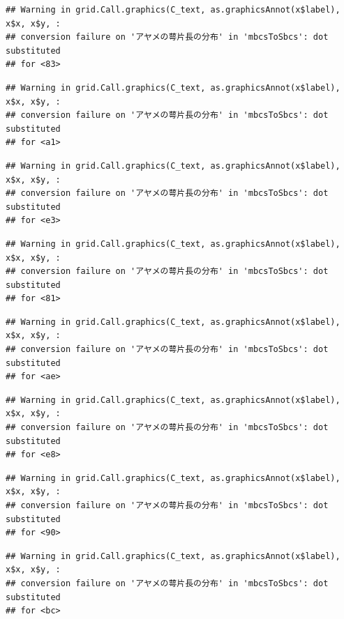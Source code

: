 \documentclass[
]{book}
\begin{document}
\begin{verbatim}
## Warning in grid.Call.graphics(C_text, as.graphicsAnnot(x$label), x$x, x$y, :
## conversion failure on 'アヤメの萼片長の分布' in 'mbcsToSbcs': dot substituted
## for <83>
\end{verbatim}

\begin{verbatim}
## Warning in grid.Call.graphics(C_text, as.graphicsAnnot(x$label), x$x, x$y, :
## conversion failure on 'アヤメの萼片長の分布' in 'mbcsToSbcs': dot substituted
## for <a1>
\end{verbatim}

\begin{verbatim}
## Warning in grid.Call.graphics(C_text, as.graphicsAnnot(x$label), x$x, x$y, :
## conversion failure on 'アヤメの萼片長の分布' in 'mbcsToSbcs': dot substituted
## for <e3>
\end{verbatim}

\begin{verbatim}
## Warning in grid.Call.graphics(C_text, as.graphicsAnnot(x$label), x$x, x$y, :
## conversion failure on 'アヤメの萼片長の分布' in 'mbcsToSbcs': dot substituted
## for <81>
\end{verbatim}

\begin{verbatim}
## Warning in grid.Call.graphics(C_text, as.graphicsAnnot(x$label), x$x, x$y, :
## conversion failure on 'アヤメの萼片長の分布' in 'mbcsToSbcs': dot substituted
## for <ae>
\end{verbatim}

\begin{verbatim}
## Warning in grid.Call.graphics(C_text, as.graphicsAnnot(x$label), x$x, x$y, :
## conversion failure on 'アヤメの萼片長の分布' in 'mbcsToSbcs': dot substituted
## for <e8>
\end{verbatim}

\begin{verbatim}
## Warning in grid.Call.graphics(C_text, as.graphicsAnnot(x$label), x$x, x$y, :
## conversion failure on 'アヤメの萼片長の分布' in 'mbcsToSbcs': dot substituted
## for <90>
\end{verbatim}

\begin{verbatim}
## Warning in grid.Call.graphics(C_text, as.graphicsAnnot(x$label), x$x, x$y, :
## conversion failure on 'アヤメの萼片長の分布' in 'mbcsToSbcs': dot substituted
## for <bc>
\end{verbatim}
\end{document}
